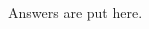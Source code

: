 \documentclass[a4paper,10pt]{article}
\begin{document}
\begin{enumerate}
\begin{enumerate}
{\color{blue} Answers are put here. 

    \begin{CJK*}{UTF8}{bsmi}

\end{CJK*}

}

    \end{enumerate}


\end{enumerate}
\end{document}
